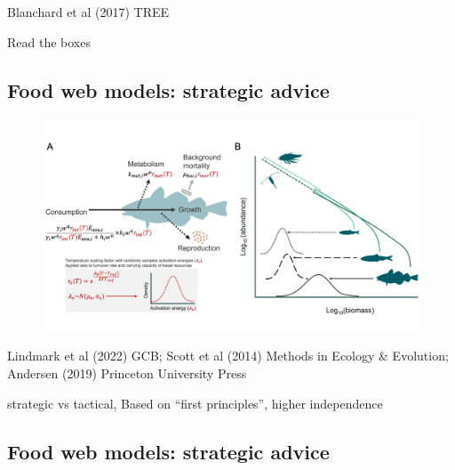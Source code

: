 \documentclass[
  letterpaper,
  DIV=11,
  numbers=noendperiod]{scrartcl}
\begin{document}
Blanchard et al (2017) TREE

Read the boxes

\hypertarget{food-web-models-strategic-advice-1}{%
\subsection{Food web models: strategic
advice}\label{food-web-models-strategic-advice-1}}

\begin{figure}

{\centering \includegraphics{images/concept_figure.png}

}

\end{figure}

Lindmark et al (2022) GCB; Scott et al (2014) Methods in Ecology \&
Evolution; Andersen (2019) Princeton University Press

strategic vs tactical, Based on ``first principles'', higher
independence

\hypertarget{food-web-models-strategic-advice-2}{%
\subsection{Food web models: strategic
advice}\label{food-web-models-strategic-advice-2}}
\end{document}
